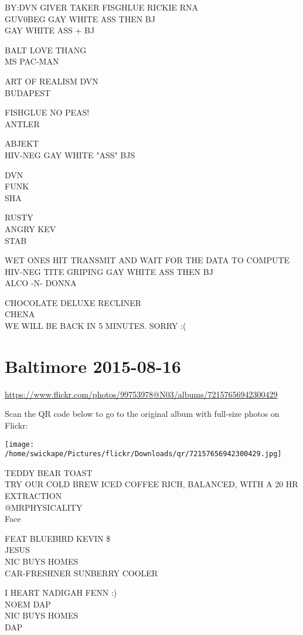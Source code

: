 \documentclass[10pt,letterpaper]{article}
\begin{document}
BY:DVN GIVER TAKER FISGHLUE RICKIE RNA\\
GUV0BEG GAY WHITE ASS THEN BJ\\
GAY WHITE ASS + BJ

BALT LOVE THANG\\
MS PAC{-}MAN

ART OF REALISM DVN\\
BUDAPEST

FISHGLUE NO PEAS!\\
ANTLER

ABJEKT\\
HIV{-}NEG GAY WHITE "ASS" BJS

DVN\\
FUNK\\
SHA

RUSTY\\
ANGRY KEV\\
STAB

WET ONES HIT TRANSMIT AND WAIT FOR THE DATA TO COMPUTE\\
HIV{-}NEG TITE GRIPING GAY WHITE ASS THEN BJ\\
ALCO {-}N{-} DONNA

CHOCOLATE DELUXE RECLINER\\
CHENA\\
WE WILL BE BACK IN 5 MINUTES.  SORRY :(


\section*{Baltimore 2015-08-16}

\url{https://www.flickr.com/photos/99753978@N03/albums/72157656942300429}

Scan the QR code below to go to the original album with full-size photos on Flickr:

\texttt{[image: /home/swickape/Pictures/flickr/Downloads/qr/72157656942300429.jpg]}


TEDDY BEAR TOAST\\
TRY OUR COLD BREW ICED COFFEE RICH, BALANCED, WITH A 20 HR EXTRACTION\\
@MRPHYSICALITY\\
Face

FEAT BLUEBIRD KEVIN \$\\
JESUS\\
NIC BUYS HOMES\\
CAR{-}FRESHNER SUNBERRY COOLER

I HEART NADIGAH FENN :)\\
NOEM DAP\\
NIC BUYS HOMES\\
DAP
\end{document}
